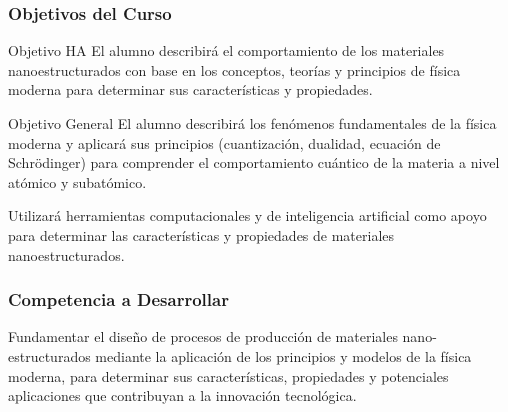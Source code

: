 \documentclass{beamer}
\begin{document}
\begin{frame}
    \frametitle{Objetivos del Curso}
   \begin{block}{Objetivo HA}
   		El alumno describirá el comportamiento de los materiales nanoestructurados con base en los conceptos, teorías y principios de física moderna para determinar sus características y propiedades.
   \end{block}
   \begin{block}{Objetivo General} 
   		 El alumno describirá los fenómenos fundamentales de la física moderna y aplicará sus principios (cuantización, dualidad, ecuación de Schrödinger) para comprender el comportamiento cuántico de la materia a nivel atómico y subatómico.
   		 
   		 Utilizará herramientas computacionales y de inteligencia artificial como apoyo para determinar las características y propiedades de materiales nanoestructurados.
    \end{block}
\end{frame}

\begin{frame}
    \frametitle{Competencia a Desarrollar}
   
   Fundamentar el diseño de procesos de producción de materiales nano-estructurados mediante la aplicación de los principios y modelos de la física moderna, para determinar sus características, propiedades y potenciales aplicaciones que contribuyan a la innovación tecnológica.
   
\end{frame}
\end{document}
